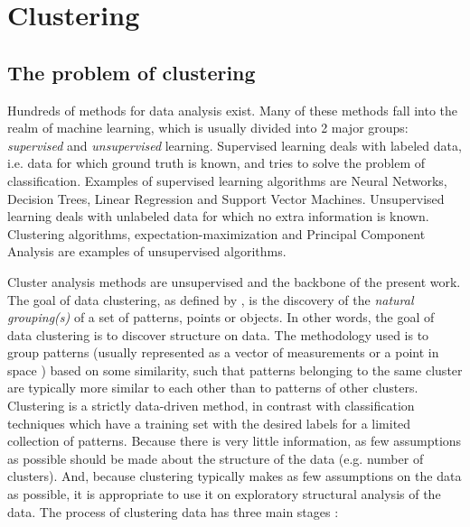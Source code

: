 
\chapter{Clustering}
\label{chapter:clustering}

\section{The problem of clustering}
\label{sec:clustering}


Hundreds of methods for data analysis exist.
Many of these methods fall into the realm of machine learning, which is usually divided into 2 major groups: \textit{supervised} and \textit{unsupervised} learning.
Supervised learning deals with labeled data, i.e. data for which ground truth is known, and tries to solve the problem of classification.
Examples of supervised learning algorithms are Neural Networks, Decision Trees, Linear Regression and Support Vector Machines. %
Unsupervised learning deals with unlabeled data for which no extra information is known.
Clustering algorithms, expectation-maximization and Principal Component Analysis are examples of unsupervised algorithms. %

Cluster analysis methods are unsupervised and the backbone of the present work.
The goal of data clustering, as defined by \cite{Jain2010}, is the discovery of the \textit{natural grouping(s)} of a set of patterns, points or objects.
In other words, the goal of data clustering is to discover structure on data.
The methodology used is to group patterns (usually represented as a vector of measurements or a point in space \cite{Jain1999}) based on some similarity, such that patterns belonging to the same cluster are typically more similar to each other than to patterns of other clusters.
Clustering is a strictly data-driven method, in contrast with classification techniques which have a training set with the desired labels for a limited collection of patterns.
Because there is very little information, as few assumptions as possible should be made about the structure of the data (e.g. number of clusters).
And, because clustering typically makes as few assumptions on the data as possible, it is appropriate to use it on exploratory structural analysis of the data.
The process of clustering data has three main stages \cite{Jain1999}:

